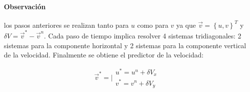 \paragraph{Observación} los pasos anteriores se realizan tanto para $u$ como para $v$ ya que $\vec{v}=\left\{ u,v \right\}^T$ y $\delta V = \vec{v}^* - \vec{v}^n $. Cada paso de tiempo implica resolver 4 sistemas tridiagonales: 2 sistemas para la componente horizontal y 2 sistemas para la componente vertical de la velocidad. Finalmente se obtiene el predictor de la velocidad:

\begin{equation}
\vec{v}^* = \Big| \begin{matrix} u^* = u^n + \delta V_x \\ v^* = v^n + \delta V_y
\end{matrix}
\end{equation}
